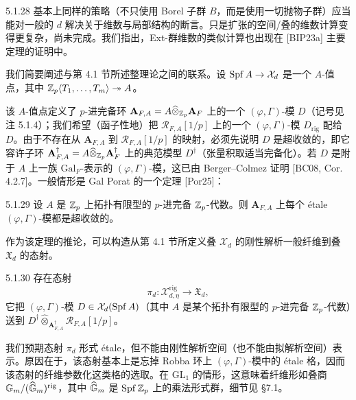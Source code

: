 \begin{rem}{5.1.28}\label{rem:a4-5-1-28}
基本上同样的策略（不只使用 Borel 子群 $B$，而是使用一切抛物子群）应当能对一般的 $d$ 解决关于维数与局部结构的断言。只是扩张的空间/叠的维数计算变得更复杂，尚未完成。我们指出，Ext-群维数的类似计算也出现在 [BIP23a] 主要定理的证明中。
\end{rem}

我们简要阐述与第 4.1 节所述整理论之间的联系。设 $\operatorname{Spf} A\to\mathcal{X}_d$ 是一个 $A$-值点，其中 $\mathbb{Z}_p\langle T_1,\dots,T_m\rangle\twoheadrightarrow A$。

该 $A$-值点定义了 $p$-进完备环 $\mathbf{A}_{F,A}=A\widehat{\otimes}_{\mathbb{Z}_p}\mathbf{A}_F$ 上的一个 $(\varphi,\Gamma)$-模 $D$（记号见注 5.1.4）；我们希望（函子性地）把 $\mathcal{R}_{F,A}[1/p]$ 上的一个 $(\varphi,\Gamma)$-模 $D_{\mathrm{rig}}$ 配给 $D$。由于不存在从 $\mathbf{A}_{F,A}$ 到 $\mathcal{R}_{F,A}[1/p]$ 的映射，必须先说明 $D$ 是超收敛的，即它容许子环 $\mathbf{A}^\dagger_{F,A}=A\widehat{\otimes}_{\mathbb{Z}_p}\mathbf{A}^\dagger_F$ 上的典范模型 $D^\dagger$（张量积取适当完备化）。若 $D$ 是附于 $A$ 上一族 $\mathrm{Gal}_F$-表示的 $(\varphi,\Gamma)$-模，这已由 Berger--Colmez 证明 [BC08, Cor. 4.2.7]。一般情形是 Gal Porat 的一个定理 [Por25]：

\begin{thm}{5.1.29}\label{thm:a4-5-1-29}
设 $A$ 是 $\mathbb{Z}_p$ 上拓扑有限型的 $p$-进完备 $\mathbb{Z}_p$-代数。则 $\mathbf{A}_{F,A}$ 上每个 étale $(\varphi,\Gamma)$-模都是超收敛的。
\end{thm}

作为该定理的推论，可以构造从第 4.1 节所定义叠 $\mathcal{X}_d$ 的刚性解析一般纤维到叠 $\mathfrak{X}_d$ 的态射。

\begin{cor}{5.1.30}\label{cor:a4-5-1-30}
存在态射
\begin{equation}
\pi_d:\mathcal{X}^{\mathrm{rig}}_{d,\eta}\longrightarrow\mathfrak{X}_d,\tag{5.1.31}
\end{equation}
它把 $(\varphi,\Gamma)$-模 $D\in\mathcal{X}_d(\operatorname{Spf} A)$（其中 $A$ 是某个拓扑有限型的 $p$-进完备 $\mathbb{Z}_p$-代数）送到 $D^\dagger\widehat{\otimes}_{\mathbf{A}^\dagger_{F,A}}\mathcal{R}_{F,A}[1/p]$。
\end{cor}

我们预期态射 $\pi_d$ 形式 étale，但不能由刚性解析空间（也不能由拟解析空间）表示。原因在于，该态射基本上是忘掉 Robba 环上 $(\varphi,\Gamma)$-模中的 étale 格，因而该态射的纤维参数化这类格的选取。在 $\mathrm{GL}_1$ 的情形，这意味着纤维形如叠商 $\mathbb{G}_m/(\widehat{\mathbb{G}}_m)^{\mathrm{rig}}$，其中 $\widehat{\mathbb{G}}_m$ 是 $\operatorname{Spf}\mathbb{Z}_p$ 上的乘法形式群，细节见 §7.1。

